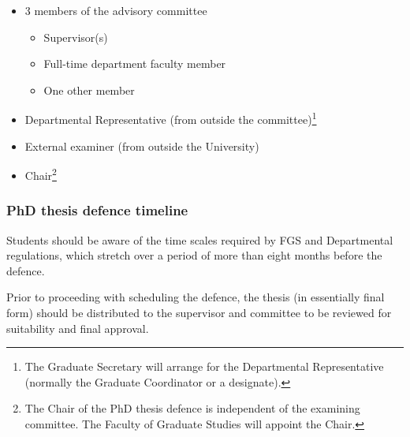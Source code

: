 \documentclass{article}
\begin{document}
\begin{itemize}

\item 3 members of the advisory committee

    \begin{itemize}

        \item Supervisor(s)

        \item Full-time department faculty member

        \item One other member

    \end{itemize}

\item Departmental Representative (from outside the committee)\footnote{The
    Graduate Secretary will arrange for the Departmental Representative
        (normally the Graduate Coordinator or a designate).}

\item External examiner (from outside the University)

    \item Chair\footnote{The Chair of the PhD thesis defence is independent of the
        examining committee. The Faculty of Graduate Studies will appoint the Chair.}

\end{itemize}


\subsubsection{PhD thesis defence timeline}

Students should be aware of the time scales required by FGS and Departmental
regulations, which stretch over a period of more than eight months before the
defence.

Prior to proceeding with scheduling the defence, the thesis (in essentially
final form) should be distributed to the supervisor and committee to be
reviewed for suitability and final approval.
\end{document}
